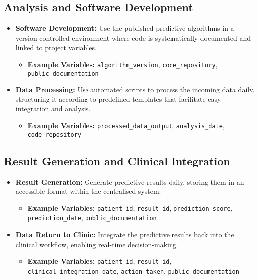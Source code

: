 \subsection*{Analysis and Software Development}
\begin{itemize}
    \item \textbf{Software Development:} Use the published predictive algorithms in a version-controlled environment where code is systematically documented and linked to project variables.
    \begin{itemize}
        \item \textbf{Example Variables:} \texttt{algorithm\_version}, \texttt{code\_repository}, \texttt{public\_documentation}
    \end{itemize}
    \item \textbf{Data Processing:} Use automated scripts to process the incoming data daily, structuring it according to predefined templates that facilitate easy integration and analysis.
    \begin{itemize}
        \item \textbf{Example Variables:} \texttt{processed\_data\_output}, \texttt{analysis\_date}, \texttt{code\_repository}
    \end{itemize}
\end{itemize}

\subsection*{Result Generation and Clinical Integration}
\begin{itemize}
    \item \textbf{Result Generation:} Generate predictive results daily, storing them in an accessible format within the centralised system.
    \begin{itemize}
        \item \textbf{Example Variables:} \texttt{patient\_id}, \texttt{result\_id}, \texttt{prediction\_score}, \texttt{prediction\_date}, \texttt{public\_documentation}
    \end{itemize}
    \item \textbf{Data Return to Clinic:}  Integrate the predictive results back into the clinical workflow, enabling real-time decision-making.
    \begin{itemize}
        \item \textbf{Example Variables:}  \texttt{patient\_id}, \texttt{result\_id}, \texttt{clinical\_integration\_date}, \texttt{action\_taken}, \texttt{public\_documentation}
    \end{itemize}
\end{itemize}

